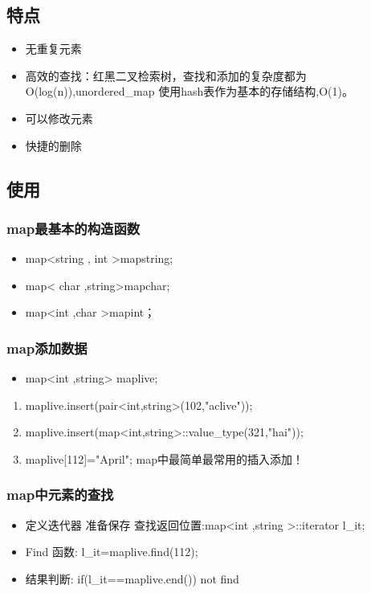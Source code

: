 \documentclass[UTF8,a4paper,12pt]{ctexbook}
\begin{document}
 	\subsection{特点}
	 	\begin{itemize}
	 		\item 无重复元素
	 		\item 高效的查找：红黑二叉检索树，查找和添加的复杂度都为O(log(n)),unordered\_map 使用hash表作为基本的存储结构,O(1)。
	 		\item 可以修改元素
	 		\item 快捷的删除
	 	\end{itemize} 
	 \subsection{使用}
		\subsubsection{map最基本的构造函数} 
			\begin{itemize}
				\item  map<string , int >mapstring;
				\item  map< char ,string>mapchar;
				\item  map<int ,char >mapint；
			\end{itemize}
		\subsubsection{map添加数据}
			\begin{itemize}
				\item map<int ,string> maplive;
			\end{itemize}
			\begin{enumerate}
				\item maplive.insert(pair<int,string>(102,"aclive"));
				\item maplive.insert(map<int,string>::value\_type(321,"hai"));
				\item maplive[112]="April";    map中最简单最常用的插入添加！
			\end{enumerate}
		\subsubsection{map中元素的查找}
			\begin{itemize}
				\item 定义迭代器 准备保存 查找返回位置:map<int ,string >::iterator l\_it;
				\item Find 函数: l\_it=maplive.find(112);
				\item 结果判断: if(l\_it==maplive.end()) not find
			\end{itemize}
\end{document}
